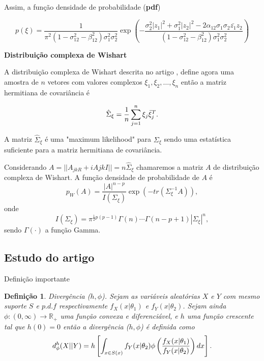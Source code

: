\documentclass[12pt,a4paper]{article}
\newtheorem{definition}{Definição}[section]
\begin{document}
Assim, a função densidade de probabilidade ({\bf pdf}) 

\begin{equation}\label{eqn79}
	p(\xi)=\frac{1}{\pi^2(1 - \sigma_{12}^{2}- \beta_{12}^2)\sigma_{1}^2\sigma_{2}^2}\exp\left(-\frac{\sigma_2^2|z_1|^2+\sigma_1^2|z_2|^2-2\alpha_{12}\sigma_1\sigma_2\bar{z_1}z_2}{(1 - \sigma_{12}^{2}- \beta_{12}^2)\sigma_{1}^2\sigma_{2}^2}
\right)  
\end{equation}

{\bf Distribuição complexa de Wishart}

A distribuição complexa de Wishart descrita no artigo \cite{goodman1963}, define agora uma amostra de  $n$ vetores com valores complexos $\xi_1,\xi_2,\dots,\xi_n$ então a matriz hermitiana de covariância é 

\begin{equation}\label{eqn80}
	\hat{\Sigma}_{\xi}=\frac{1}{n}\sum_{j=1}^{n}\xi_j\bar{\xi}_{j}^{T} . \\
\end{equation}

A matriz $\hat{\Sigma}_{\xi}$ é uma "maximum likelihood" para $\Sigma_{\xi}$ sendo uma estatística suficiente para a matriz hermitiana de covariância.

Considerando $A=||A_{jkR}+iA{jkI}||=n\hat{\Sigma}_{\xi}$ chamaremos a matriz $A$ de distribuição complexa de Wishart. A função densidade de probabilidade de $A$ é
\begin{equation}\label{eqn81}
	p_W(A)=\frac{|A|^{n-p}}{I(\Sigma_{\xi})} \exp(-tr(\Sigma_{\xi}^{-1}A)), 
\end{equation}
onde
\begin{equation}\label{eqn82}
	I(\Sigma_{\xi})=\pi^{\frac{1}{2}p(p-1)}\Gamma(n)\cdots\Gamma(n-p+1)|\Sigma_{\xi}|^n, 
\end{equation}
sendo $\Gamma(\cdot)$ a função Gamma.

\subsection{Estudo do artigo  \cite{salicru_pardo_1994}}

Definição importante  

\begin{definition}{Divergência ($h,\phi$).}
	Sejam as variáveis aleatórias $X$ e $Y$ com mesmo suporte $S$  e $p.d.f$ respectivamente $f_{X}(x|\theta_1)$ e $f_{Y}(x|\theta_2)$. Sejam ainda $\phi:(0,\infty)\rightarrow \mathbb{R}_+$ uma função convexa e diferenciável, e $h$ uma função crescente tal que $h(0)=0$ então a divergência ($h,\phi$) é definida como
\begin{equation}\label{eqn83}
	d_{\phi}^{h}(X||Y)=h\left[\int_{x\in S(x)} f_{Y}(x|\theta_2)\phi\left(\frac{f_{X}(x|\theta_1)}{f_{Y}(x|\theta_2)}\right)dx \right]. \\
\end{equation}
\end{definition}
\end{document}
